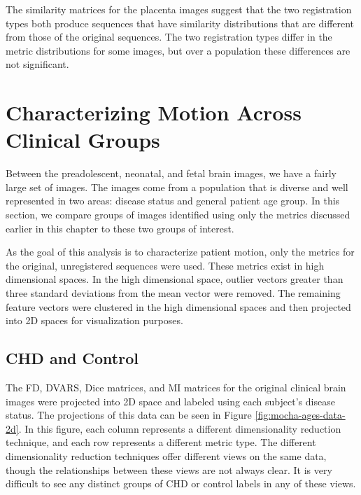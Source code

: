 The similarity matrices for the placenta images suggest that the two registration types both produce sequences that have similarity distributions that are different from those of the original sequences. The two registration types differ in the metric distributions for some images, but over a population these differences are not significant.

\section{Characterizing Motion Across Clinical Groups}

Between the preadolescent, neonatal, and fetal brain images, we have a fairly large set of images. The images come from a population that is diverse and well represented in two areas: disease status and general patient age group. In this section, we compare groups of images identified using only the metrics discussed earlier in this chapter to these two groups of interest. 

As the goal of this analysis is to characterize patient motion, only the metrics for the original, unregistered sequences were used. These metrics exist in high dimensional spaces. In the high dimensional space, outlier vectors greater than three standard deviations from the mean vector were removed. The remaining feature vectors were clustered in the high dimensional spaces and then projected into 2D spaces for visualization purposes.

\subsection{CHD and Control}

The FD, DVARS, Dice matrices, and MI matrices for the original clinical brain images were projected into 2D space and labeled using each subject's disease status. The projections of this data can be seen in Figure \ref{fig:mocha-ages-data-2d}. In this figure, each column represents a different dimensionality reduction technique, and each row represents a different metric type. The different dimensionality reduction techniques offer different views on the same data, though the relationships between these views are not always clear. It is very difficult to see any distinct groups of CHD or control labels in any of these views.

